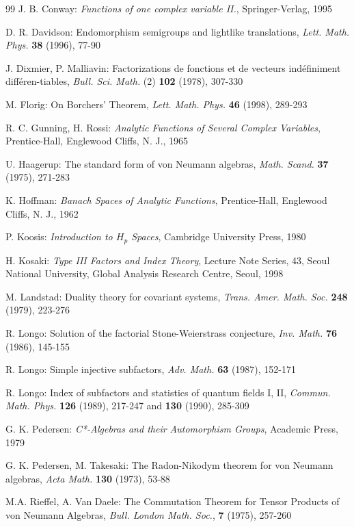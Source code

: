 \documentclass[reqno]{amsart}
\theoremstyle{definition}
\theoremstyle{remark}
\numberwithin{equation}{section}
\theoremstyle{plain}
\begin{document}
\begin{thebibliography}{99}
 J. B. Conway: \emph{Functions of one complex variable
II.}, Springer-Verlag, 1995

 D. R. Davidson: Endomorphism semigroups and lightlike
translations, \emph{Lett. Math. Phys.} \textbf{38} (1996), 77-90

 J. Dixmier, P. Malliavin: Factorizations de
fonctions et de vecteurs ind\'efiniment diff\'eren-tiables,
\emph{Bull. Sci. Math.} (2) \textbf{102} (1978), 307-330

 M. Florig: On Borchers' Theorem, \emph{Lett. Math. Phys.}
\textbf{46} (1998), 289-293

 R. C. Gunning, H. Rossi: \emph{Analytic Functions
of Several Complex Variables}, Prentice-Hall, Englewood Cliffs, N. J.,
1965

 U. Haagerup: The standard form of von Neumann
algebras, \emph{Math. Scand.} \textbf{37} (1975), 271-283

 K. Hoffman: \emph{Banach Spaces of Analytic Functions},
Prentice-Hall, Englewood Cliffs, N. J., 1962

 P. Koosis: \emph{Introduction to $H_p$ Spaces},
Cambridge University Press, 1980

 H. Kosaki: \emph{Type III Factors and Index Theory},
Lecture Note Series, 43, Seoul National University, Global Analysis
Research Centre, Seoul, 1998

 M. Landstad: Duality theory for covariant systems,
\emph{Trans. Amer. Math. Soc.} \textbf{248} (1979), 223-276

 R. Longo: Solution of the factorial Stone-Weierstrass
conjecture, \emph{Inv. Math.} \textbf{76} (1986), 145-155

 R. Longo: Simple injective subfactors, \emph{Adv. Math.}
\textbf{63} (1987), 152-171

 R. Longo: Index of subfactors and statistics of
quantum fields I, II, \emph{Commun. Math. Phys.} \textbf{126} (1989),
217-247 and \textbf{130} (1990), 285-309

 G. K. Pedersen: \emph{C*-Algebras and their
Automorphism Groups}, Academic Press, 1979

 G. K. Pedersen, M. Takesaki: The Radon-Nikodym
theorem for von Neumann algebras, \emph{Acta Math.} \textbf{130} (1973),
53-88

 M.A. Rieffel, A. Van Daele: The Commutation
Theorem for Tensor Products of von Neumann Algebras, \emph{Bull.
London Math. Soc.}, \textbf{7} (1975), 257-260


\end{thebibliography}
\end{document}
